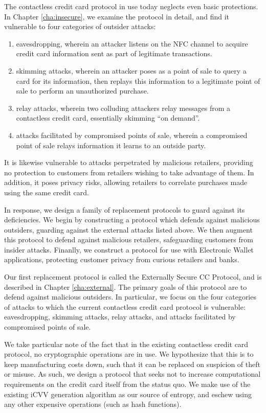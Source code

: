 The contactless credit card protocol in use today neglects even basic protections.
In Chapter \ref{cha:insecure}, we examine the protocol in detail, and find it vulnerable to four categories of outsider attacks:
\begin{enumerate}
    \item eavesdropping, wherein an attacker listens on the NFC channel to acquire credit card information sent as part of legitimate transactions.
    \item skimming attacks, wherein an attacker poses as a point of sale to query a card for its information,
        then replays this information to a legitimate point of sale to perform an unauthorized purchase.
    \item relay attacks, wherein two colluding attackers relay messages from a contactless credit card,
        essentially skimming ``on demand''.
    \item attacks facilitated by compromised points of sale, wherein a compromised point of sale relays information it learns to an outside party.
\end{enumerate}

It is likewise vulnerable to attacks perpetrated by malicious retailers,
    providing no protection to customers from retailers wishing to take advantage of them.
In addition, it poses privacy risks, allowing retailers to correlate purchases made using the same credit card.

In response, we design a family of replacement protocols to guard against its deficiencies.
We begin by constructing a protocol which defends against malicious outsiders, guarding against the external attacks listed above.
We then augment this protocol to defend against malicious retailers, safeguarding customers from insider attacks.
Finanlly, we construct a protocol for use with Electronic Wallet applications, protecting customer privacy from curious retailers and banks.


Our first replacement protocol is called the Externally Secure CC Protocol, and is described in Chapter \ref{cha:external}.
The primary goals of this protocol are to defend against malicious outsiders.
In particular, we focus on the four categories of attacks to which the current contactless credit card protocol is vulnerable:
    eavesdropping, skimming attacks, relay attacks, and attacks facilitated by compromised points of sale.

We take particular note of the fact that in the existing contactless credit card protocol, no cryptographic operations are in use.
We hypothesize that this is to keep manufacturing costs down, such that it can be replaced on suspicion of theft or misuse.
As such, we design a protocol that seeks not to increase computational requirements on the credit card itself from the status quo.
We make use of the existing iCVV generation algorithm as our source of entropy, and eschew using any other expensive operations (such as hash functions).


